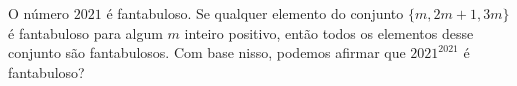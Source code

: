O número $2021$ é fantabuloso.
Se qualquer elemento do conjunto $\{m, 2m+1, 3m\}$ é fantabuloso para algum $m$ inteiro positivo, então todos os elementos desse conjunto são fantabulosos.
Com base nisso, podemos afirmar que $2021^{2021}$ é fantabuloso?

